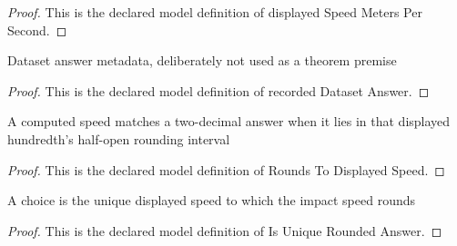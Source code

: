 \begin{proof}
  This is the declared model definition of displayed Speed Meters Per Second.
\end{proof}
\begin{definition}
  \label{def:physics:phyx-mini-0774:phyxminiproblems-problemphyxmini0774-recordeddatasetanswer}
  Dataset answer metadata, deliberately not used as a theorem premise
\end{definition}
\begin{proof}
  This is the declared model definition of recorded Dataset Answer.
\end{proof}
\begin{definition}
  \label{def:physics:phyx-mini-0774:phyxminiproblems-problemphyxmini0774-roundstodisplayedspeed}
  A computed speed matches a two-decimal answer when it lies in that displayed hundredth's half-open rounding interval
\end{definition}
\begin{proof}
  This is the declared model definition of Rounds To Displayed Speed.
\end{proof}
\begin{definition}
  \label{def:physics:phyx-mini-0774:phyxminiproblems-problemphyxmini0774-isuniqueroundedanswer}
  A choice is the unique displayed speed to which the impact speed rounds
\end{definition}
\begin{proof}
  This is the declared model definition of Is Unique Rounded Answer.
\end{proof}
